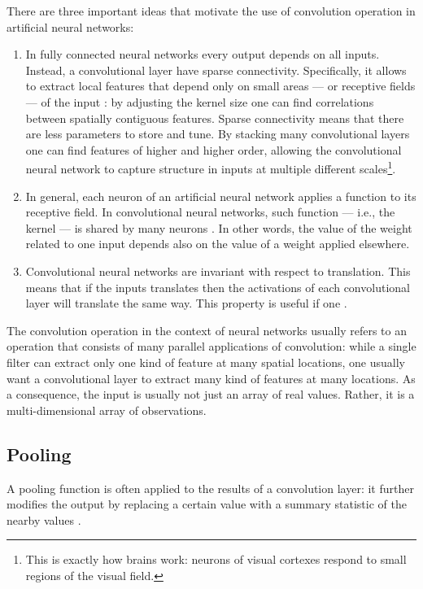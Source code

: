             There are three important ideas that motivate the use of convolution operation in artificial neural networks:
            \begin{enumerate}
                \item In fully connected neural networks every output depends on all inputs. Instead, a convolutional layer have sparse connectivity. Specifically, it allows to extract local features that depend only on small areas --- or receptive fields --- of the input \cite[267]{Bishop}: by adjusting the kernel size one can find correlations between spatially contiguous features. Sparse connectivity means that there are less parameters to store and tune. By stacking many convolutional layers one can find features of higher and higher order, allowing the convolutional neural network to capture structure in inputs at multiple different scales\footnote{This is exactly how brains work: neurons of visual cortexes respond to small regions of the visual field.}.
                \item In general, each neuron of an artificial neural network applies a function to its receptive field. In convolutional neural networks, such function --- i.e., the kernel --- is shared by many neurons \cite[335]{Goodfellow}. In other words, the value of the weight related to one input depends also on the value of a weight applied elsewhere.
                \item Convolutional neural networks are invariant with respect to translation. This means that if the inputs translates then the activations of each convolutional layer will translate the same way. This property is useful if one  \cite[342]{Goodfellow}.
            \end{enumerate}

            The convolution operation in the context of neural networks usually refers to an operation that consists of many parallel applications of convolution: while a single filter can extract only one kind of feature at many spatial locations, one usually want a convolutional layer to extract many kind of features at many locations. As a consequence, the input is usually not just an array of real values. Rather, it is a multi-dimensional array of observations.
        \subsection{Pooling}
            A pooling function is often applied to the results of a convolution layer: it further modifies the output by replacing a certain value with a summary statistic of the nearby values \cite[339]{Goodfellow}.
            
